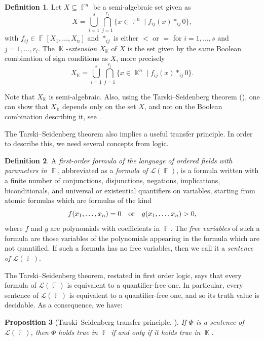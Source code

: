 \documentclass{amsart}
\theoremstyle{plain}
\newtheorem{proposition}{Proposition}[section]
\theoremstyle{definition}
\newtheorem{definition}[proposition]{Definition}
\DeclareMathOperator{\Fb}{{\mathbb{F}}}
\DeclareMathOperator{\Kb}{\mathbb{K}}
\newcommand{\1}{\mathbf{1}}
\begin{document}
\begin{definition}
\label{dfn_ExtSemiAlgSets}
Let $X \subseteq \Fb^n$ be a semi-algebraic set given as
\[ X = \bigcup_{i=1}^s\bigcap_{j=1}^{r_i} \{x \in \Fb^n \mid f_{ij}(x) \ast_{ij} 0 \},\]
with $f_{ij} \in \Fb[X_1,\ldots,X_n]$ and $\ast_{ij}$ is either $<$ or $=$ for $i = 1, \ldots,s$ and $j=1,\ldots,r_i$.
The \emph{$\Kb$-extension $X_{\Kb}$} of $X$ is the set given by the same Boolean combination of sign conditions as $X$, more precisely
\[X_{\Kb} = \bigcup_{i=1}^s\bigcap_{j=1}^{r_i} \{x \in \Kb^n \mid f_{ij}(x) \ast_{ij} 0 \}.\]
\end{definition}

Note that $X_{\Kb}$ is semi-algebraic. Also, using the Tarski--Seidenberg theorem (), one can show that $X_{\Kb}$ depends only on the set $X$, and not on the Boolean combination describing it, see \cite[Proposition 5.1.1]{BochnakCosteRoy_RealAlgebraicGeometry}.

The Tarski--Seidenberg theorem also implies a useful transfer principle. In order to describe this, we need several concepts from logic.

\begin{definition}
    A \emph{first-order formula of the language of ordered fields with parameters in $\Fb$},     abbreviated as a \emph{formula of $\mathcal L(\Fb)$}, is a formula written with a finite number of conjunctions, disjunctions, negations, implications, biconditionals, and universal or existential quantifiers on variables, starting from atomic formulas which are formulas of the kind
    \[f(x_1,\ldots, x_n) = 0 \quad \textnormal{or} \quad g(x_1,\ldots,x_n) > 0, \]
    where $f$ and $g$ are polynomials with coefficients in $\Fb$. 
    The \emph{free variables} of such a formula are those variables of the polynomials appearing in the formula which are not quantified. If such a formula has no free variables, then we call it a \emph{sentence of $\mathcal L(\Fb)$}.
\end{definition}

The Tarski--Seidenberg theorem, restated in first order logic, says that every formula of $\mathcal L(\Fb)$ is equivalent to a quantifier-free one. In particular, every sentence of $\mathcal L(\Fb)$ is equivalent to a quantifier-free one, and so its truth value is decidable. As a consequence, we have:

\begin{proposition}[Tarski--Seidenberg transfer principle, {\cite[Proposition 5.2.3]{BochnakCosteRoy_RealAlgebraicGeometry}}]
\label{thm_TarskiSeidenberg}
    If $\Phi$ is a sentence of $\mathcal{L}(\Fb)$, then $\Phi$ holds true in $\Fb$ if and only if it holds true in $\Kb$.
\end{proposition}
\end{document}
